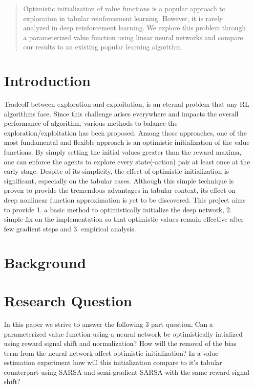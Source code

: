 \documentclass{article}
\theoremstyle{plain}
\theoremstyle{definition}
\theoremstyle{remark}
\begin{document}
\begin{abstract}
Optimistic initialization of value functions is a popular approach to exploration
in tabular reinforcement learning. However, it is rarely analyzed
in deep reinforcement learning. We explore this problem through a parameterized
value function using linear neural networks and compare our results to an existing popular 
learning algorithm.
\end{abstract}

\section{Introduction}
Tradeoff between exploration and exploitation, is an eternal problem that any RL algorithms face.
Since this challenge arises everywhere and impacts the overall performance of algorithm, various methods to balance the exploration/exploitation has been proposed.
Among those approaches, one of the most fundamental and flexible approach is an optimistic initialization of the value functions.
By simply setting the initial values greater than the reward maxima, one can enforce the agents to explore every state(-action) pair at least once at the early stage.
Despite of its simplicity, the effect of optimistic initialization is significant, especially on the tabular cases.
Although this simple technique is proven to provide the tremendous advantages in tabular context, its effect on deep nonlinear function approximation is yet to be discovered.
This project aims to provide 1. a basic method to optimistically initialize the deep network, 2. simple fix on the implementation so that optimistic values remain effective after few gradient steps and 3. empirical analysis.


\medskip
\section{Background}


\section{Research Question}
In this paper we strive to answer the following 3 part question,
Can a parameterized value function using a neural network be optimistically intialized using reward signal shift and normalization?
How will the removal of the bias term from the neural network affect optimistic initialization?
In a value estimation experiment how will this initialization compare to it's tabular counterpart using 
SARSA and semi-gradient SARSA with the same reward signal shift?
\end{document}
